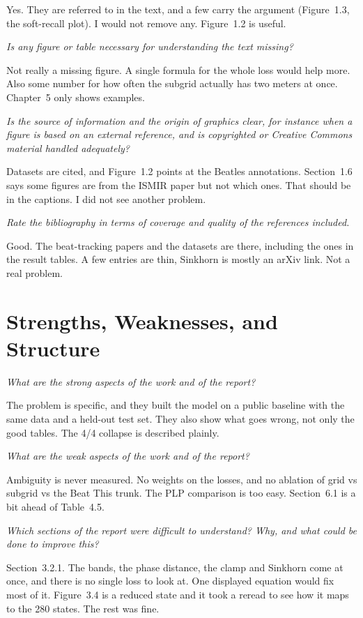 \documentclass[11pt,a4paper]{article}
\newcommand{\prompt}[1]{%
  \par\medskip
  \noindent\textit{#1}%
  \par\smallskip
}
\begin{document}
Yes. They are referred to in the text, and a few carry the argument (Figure~1.3, the soft-recall plot). I would not remove any. Figure~1.2 is useful.

\prompt{Is any figure or table necessary for understanding the text missing?}

Not really a missing figure. A single formula for the whole loss would help more. Also some number for how often the subgrid actually has two meters at once. Chapter~5 only shows examples.

\prompt{Is the source of information and the origin of graphics clear, for instance when a figure is based on an external reference, and is copyrighted or Creative Commons material handled adequately?}

Datasets are cited, and Figure~1.2 points at the Beatles annotations. Section~1.6 says some figures are from the ISMIR paper but not which ones. That should be in the captions. I did not see another problem.

\prompt{Rate the bibliography in terms of coverage and quality of the references included.}

Good. The beat-tracking papers and the datasets are there, including the ones in the result tables. A few entries are thin, Sinkhorn is mostly an arXiv link. Not a real problem.

\section{Strengths, Weaknesses, and Structure}

\prompt{What are the strong aspects of the work and of the report?}

The problem is specific, and they built the model on a public baseline with the same data and a held-out test set. They also show what goes wrong, not only the good tables. The 4/4 collapse is described plainly.

\prompt{What are the weak aspects of the work and of the report?}

Ambiguity is never measured. No weights on the losses, and no ablation of grid vs subgrid vs the Beat This trunk. The PLP comparison is too easy. Section~6.1 is a bit ahead of Table~4.5.

\prompt{Which sections of the report were difficult to understand? Why, and what could be done to improve this?}

Section~3.2.1. The bands, the phase distance, the clamp and Sinkhorn come at once, and there is no single loss to look at. One displayed equation would fix most of it. Figure~3.4 is a reduced state and it took a reread to see how it maps to the 280 states. The rest was fine.
\end{document}
